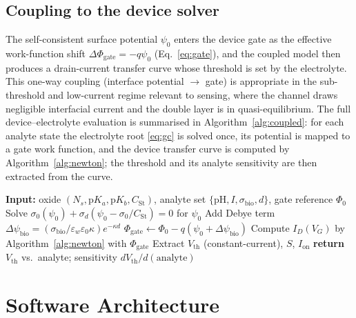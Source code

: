 \documentclass[10pt,journal]{IEEEtran}
\begin{document}
\subsection{Coupling to the device solver}
The self-consistent surface potential $\psi_0$ enters the device gate as the
effective work-function shift $\Delta\Phi_{\mathrm{gate}}=-q\psi_0$
(Eq.~\eqref{eq:gate}), and the coupled model then produces a drain-current
transfer curve whose threshold is set by the electrolyte. This one-way coupling
(interface potential $\to$ gate) is appropriate in the sub-threshold and
low-current regime relevant to sensing, where the channel draws negligible
interfacial current and the double layer is in quasi-equilibrium. The full
device--electrolyte evaluation is summarised in Algorithm~\ref{alg:coupled}: for
each analyte state the electrolyte root \eqref{eq:gc} is solved once, its
potential is mapped to a gate work function, and the device transfer curve is
computed by Algorithm~\ref{alg:newton}; the threshold and its analyte
sensitivity are then extracted from the curve.

\begin{algorithm}[t]
\caption{Coupled device--electrolyte biosensor evaluation}
\label{alg:coupled}
\begin{algorithmic}[1]
\State \textbf{Input:} oxide $(N_s,\mathrm{p}K_a,\mathrm{p}K_b,C_{\mathrm{St}})$,
       analyte set $\{$pH$,I,\sigma_{\mathrm{bio}},d\}$, gate reference $\Phi_0$
  \State Solve $\sigma_0(\psi_0)+\sigma_d(\psi_0-\sigma_0/C_{\mathrm{St}})=0$
         for $\psi_0$ 
  \State Add Debye term $\Delta\psi_{\mathrm{bio}}=(\sigma_{\mathrm{bio}}/\varepsilon_w\varepsilon_0\kappa)e^{-\kappa d}$
  \State $\Phi_{\mathrm{gate}} \gets \Phi_0 - q(\psi_0+\Delta\psi_{\mathrm{bio}})$
  \State Compute $I_D(V_G)$ by Algorithm~\ref{alg:newton} with $\Phi_{\mathrm{gate}}$
  \State Extract $V_{\mathrm{th}}$ (constant-current), $S$, $I_{\mathrm{on}}$
\EndFor
\State \textbf{return} $V_{\mathrm{th}}$ vs.\ analyte; sensitivity $dV_{\mathrm{th}}/d(\text{analyte})$
\end{algorithmic}
\end{algorithm}

\section{Software Architecture}
\label{sec:arch}
\end{document}
